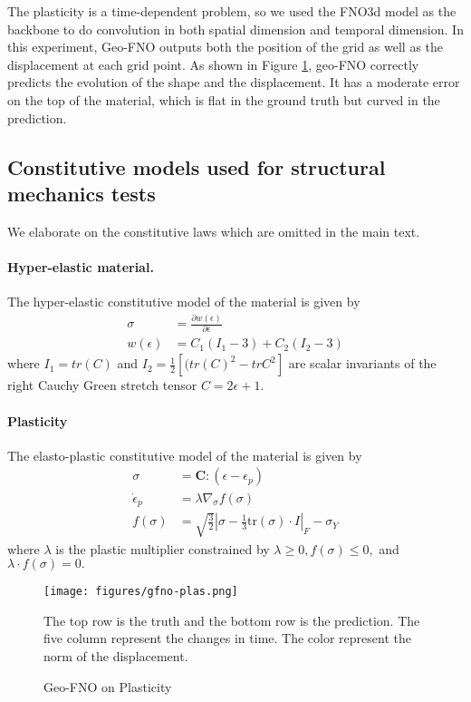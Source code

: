 \documentclass{article}
\begin{document}
The plasticity is a time-dependent problem, so we used the FNO3d model as the backbone to do convolution in both spatial dimension and temporal dimension. In this experiment, Geo-FNO outputs both the position of the grid as well as the displacement at each grid point. As shown in Figure \ref{fig:plas}, geo-FNO correctly predicts the evolution of the shape and the displacement. It has a moderate error on the top of the material, which is flat in the ground truth but curved in the prediction. 

\subsection{Constitutive models used for structural mechanics tests}
We elaborate on the constitutive laws which are omitted in the main text.
\paragraph{Hyper-elastic material.} 
The hyper-elastic constitutive model of the material is given by 
\begin{align*}
\sigma &= \frac{\partial w(\epsilon)}{\partial \epsilon}\\
 w(\epsilon) &= C_1(I_1 - 3) + C_2(I_2 - 3)
\end{align*}
where $I_1 = tr(C)$ and $I_2 = \frac{1}{2}[(tr(C)^2 - trC^2]$ are scalar invariants of the right Cauchy Green stretch tensor $C = 2\epsilon+1$.




\paragraph{Plasticity}
The elasto-plastic constitutive model 
of the material is given by 
\begin{align*}
\sigma &= \textbf{C} : (\epsilon-\epsilon_p)\\
\dot{\epsilon}_p &= \lambda \nabla_{\sigma} f(\sigma)\\
f(\sigma) &= \sqrt{\frac{3}{2}}|\sigma-\frac{1}{3}\text{tr}(\sigma)\cdot I|_F - \sigma_Y
\end{align*}
where $\lambda$ is the plastic multiplier constrained by
$\lambda \geq 0 , f(\sigma)  \leq 0, $
and 
$\lambda \cdot f(\sigma)  = 0.$

\begin{figure}
    \centering
    \texttt{[image: figures/gfno-plas.png]}
    \caption{Geo-FNO on Plasticity}
    \label{fig:plas}
    {\small The top row is the truth and the bottom row is the prediction. The five column represent the changes in time. The color represent the norm of the displacement.}
\end{figure}
\end{document}
